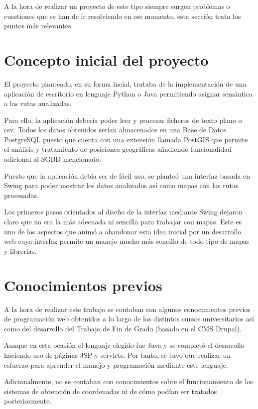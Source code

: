 
A la hora de realizar un proyecto de este tipo siempre surgen problemas o cuestiones que se han de ir resolviendo en ese momento, esta sección trata los puntos más relevantes.

\section{Concepto inicial del proyecto}
El proyecto planteado, en su forma incial, trataba de la implementación de una aplicación de escritorio en lenguaje Python o Java permitiendo asignar semántica a las rutas analizadas.

Para ello, la aplicación debería poder leer y procesar ficheros de texto plano o csv. Todos los datos obtenidos serían almacenados en una Base de Datos PostgreSQL puesto que cuenta con una extensión llamada PostGIS que permite el análisis y tratamiento de posiciones geográficas añadiendo funcionalidad adicional al SGBD mencionado.

Puesto que la aplicación debía ser de fácil uso, se planteó una interfaz basada en Swing para poder mostrar los datos analizados así como mapas con las rutas procesadas.

Los primeros pasos orientados al diseño de la interfaz mediante Swing dejaron claro que no era la más adecuada ni sencilla para trabajar con mapas. Este es uno de los aspectos que animó a abandonar esta idea inicial por un desarrollo web cuya interfaz permite un manejo mucho más sencillo de todo tipo de mapas y librerías.

\section{Conocimientos previos}
A la hora de realizar este trabajo se contaban con algunos conocimientos previos  de programación web obtenidos a lo largo de los distintos cursos universitarios así como del desarrollo del Trabajo de Fin de Grado (basado en el CMS Drupal).

Aunque en esta ocasión el lenguaje elegido fue Java y se completó el desarrollo haciendo uso de páginas JSP y servlets. Por tanto, se tuvo que realizar un esfuerzo para aprender el manejo y programación mediante este lenguaje.

Adicionalmente, no se contaban con conocimientos sobre el funcionamiento de los sistemas de obtención de coordenadas ni de cómo podían ser tratados posteriormente.


